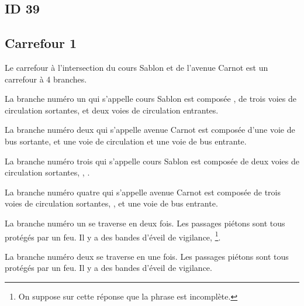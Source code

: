 \begin{appendix}

\section*{ID 39}

\label{annexe:q_ID39}

\subsection*{Carrefour 1}

\label{annexe:q_ID39_carrefour1}

Le carrefour à l'intersection du cours Sablon et de l'avenue Carnot est un carrefour à 4 branches.

\newpar{}

La branche numéro un qui s'appelle cours Sablon est composée , de trois voies de circulation sortantes, et deux voies de circulation entrantes.

\newpar{}

La branche numéro deux qui s'appelle avenue Carnot est composée d'une voie de bus sortante, et une voie de circulation et une voie de bus entrante.

\newpar{}

La branche numéro trois qui s'appelle cours Sablon est composée de deux voies de circulation sortantes, , .

\newpar{}

La branche numéro quatre qui s'appelle avenue Carnot est composée de trois voies de circulation sortantes, , et une voie de bus entrante.

\newpar{}

La branche numéro un se traverse en deux fois. Les passages piétons sont tous protégés par un feu. Il y a des bandes d'éveil de vigilance, \footnote{On suppose sur cette réponse que la phrase est incomplète.}.

\newpar{}

La branche numéro deux se traverse en une fois. Les passages piétons sont tous protégés par un feu. Il y a des bandes d'éveil de vigilance.

\newpar{}


\end{appendix}
